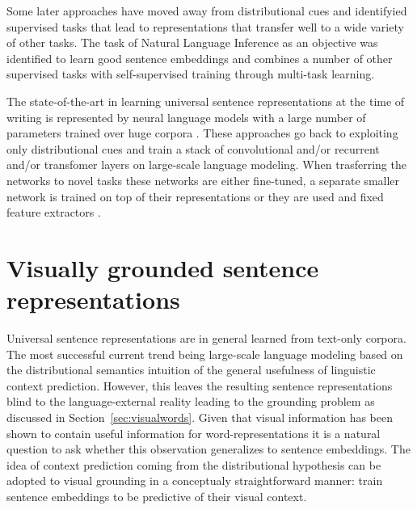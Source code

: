 Some later approaches have  moved away from distributional cues
and identifyied supervised tasks that lead to representations that transfer
well to a wide variety of other tasks. The task of Natural Language Inference \citep{bowman2015large,williams2017broad} as an objective
was identified to learn good sentence embeddings \citep{conneau-EtAl:2017:EMNLP2017,kiros2018inferlite}
and \cite{subramanian2018learning} combines a number of other supervised tasks
with self-supervised training through multi-task learning.


The state-of-the-art in learning universal sentence representations
at the time of writing is represented by neural language models 
with a large number of parameters
trained over huge corpora \citep{peters2018deep,devlin2018bert}.
These approaches go back to
exploiting only distributional cues and train a stack of convolutional and/or recurrent
and/or transfomer layers on large-scale language modeling.
When trasferring the networks to novel tasks these networks are either fine-tuned, a
separate smaller network is trained on top of their representations or they are used and
fixed feature extractors \citep{howard2018universal,peters2019tune}.

\section{Visually grounded sentence representations}
\label{sec:visualsentences}

Universal sentence representations are in general learned from text-only corpora. The most 
successful current trend being large-scale language modeling based on
the distributional semantics intuition of the general usefulness of linguistic context prediction.
However, this leaves the resulting sentence representations blind to the language-external 
reality leading to the grounding problem
as discussed in Section~\ref{sec:visualwords}. Given that visual information
has been shown to contain useful information for word-representations it
is a natural question to ask whether this observation generalizes to sentence
embeddings. The idea of context prediction coming from the distributional 
hypothesis can be adopted to visual grounding in a conceptualy straightforward manner:
train sentence embeddings to be predictive of their visual context. 


